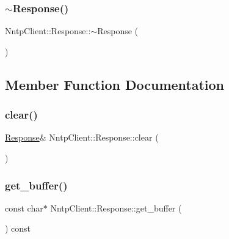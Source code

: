 \hypertarget{class_nntp_client_1_1_response_a19fab64682ec4d33c0edae79371e8651}{}\label{class_nntp_client_1_1_response_a19fab64682ec4d33c0edae79371e8651} 
\subsubsection{\texorpdfstring{$\sim$\+Response()}{~Response()}}
{\footnotesize\ttfamily Nntp\+Client\+::\+Response\+::$\sim$\+Response (\begin{DoxyParamCaption}{ }\end{DoxyParamCaption})\hspace{0.3cm}{\ttfamily [inline]}}



\subsection{Member Function Documentation}
\hypertarget{class_nntp_client_1_1_response_acd5875ba908a6ae4796e1a7741df2329}{}\label{class_nntp_client_1_1_response_acd5875ba908a6ae4796e1a7741df2329} 
\subsubsection{\texorpdfstring{clear()}{clear()}}
{\footnotesize\ttfamily \hyperlink{class_nntp_client_1_1_response}{Response}\& Nntp\+Client\+::\+Response\+::clear (\begin{DoxyParamCaption}{ }\end{DoxyParamCaption})\hspace{0.3cm}{\ttfamily [inline]}}

\hypertarget{class_nntp_client_1_1_response_a1e8cf1ff5d40a519e256c65db6a8496a}{}\label{class_nntp_client_1_1_response_a1e8cf1ff5d40a519e256c65db6a8496a} 
\subsubsection{\texorpdfstring{get\+\_\+buffer()}{get\_buffer()}}
{\footnotesize\ttfamily const char$\ast$ Nntp\+Client\+::\+Response\+::get\+\_\+buffer (\begin{DoxyParamCaption}{ }\end{DoxyParamCaption}) const\hspace{0.3cm}{\ttfamily [inline]}}

